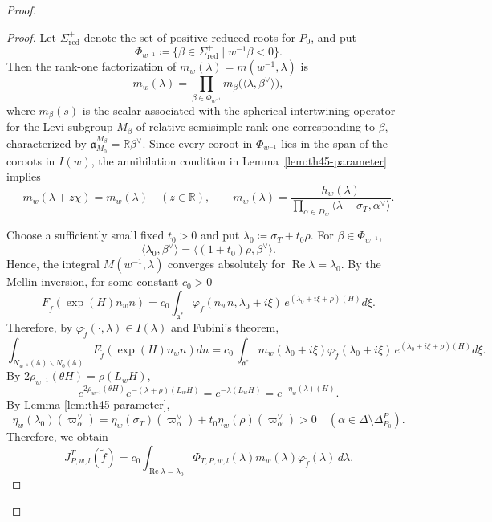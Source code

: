 \documentclass[12pt]{amsart}
\theoremstyle{definition}
\theoremstyle{plain}
\theoremstyle{remark}
\def\R{\mathbb{R}}%
\def\A{\mathbb{A}}%
\def\bs{\backslash}%
\newcommand{\fa}{\mathfrak{a}}
\numberwithin{equation}{section}
\newcommand{\tf}{\tilde{f}}
\begin{document}
\begin{proof}
\begin{proof}
Let $\Sigma_{\mathrm{red}}^+$ denote the set of positive reduced roots for $P_0$, and put
\[
 \Phi_{w^{-1}} \coloneqq  \{\beta\in\Sigma_{\mathrm{red}}^+\mid w^{-1}\beta<0\}.
\]
Then the rank-one factorization of \(m_w(\lambda)=m(w^{-1},\lambda)\) is
\[
 m_w(\lambda) =
 \prod_{\beta\in\Phi_{w^{-1}}}
 m_\beta\bigl(\langle\lambda,\beta^\vee\rangle\bigr),
\]
where $m_\beta(s)$ is the scalar associated with the spherical intertwining operator for the Levi subgroup $M_\beta$ of relative semisimple rank one corresponding to $\beta$, characterized by $\mathfrak a_{M_0}^{M_\beta}=\mathbb R\beta^\vee$. 
Since every coroot in $\Phi_{w^{-1}}$ lies in the span of the coroots in $I(w)$, 
the annihilation condition in Lemma~\ref{lem:th45-parameter} implies
\[
 m_w(\lambda+z\chi)=m_w(\lambda) \quad (z\in\R),\qquad
 m_w(\lambda)=
 \frac{h_w(\lambda)}
      {\prod_{\alpha\in D_w}
                       \langle\lambda-\sigma_T,\alpha^\vee\rangle}.
\]


Choose a sufficiently small fixed $t_0>0$ and put
$\lambda_0\coloneqq \sigma_T+t_0\rho$.
For $\beta\in\Phi_{w^{-1}}$, 
\[
\langle \lambda_0,\beta^\vee\rangle=\langle (1+t_0)\rho,\beta^\vee\rangle.
\]
Hence, the integral $M(w^{-1},\lambda)$ converges absolutely for $\operatorname{Re}\lambda=\lambda_0$. 
By the Mellin inversion, for some constant $c_0> 0$
\[
F_{\tf}(\exp(H)n_wn)=c_0 \int_{\fa^*} \varphi_{\tf}(n_wn,\lambda_0+i\xi)\, e^{(\lambda_0+i\xi+\rho)(H)}d\xi.
\]
Therefore, by $\varphi_{\tf}(\cdot,\lambda)\in I(\lambda)$ and Fubini's theorem, 
\[
\int_{N_{w^{-1}}(\A)\bs N_0(\A)} F_{\tf}(\exp(H)n_wn)dn=c_0 \, \int_{\fa^*}m_w(\lambda_0+i\xi) \varphi_{\tf}(\lambda_0+i\xi)\, e^{(\lambda_0+i\xi+\rho)(H)}d\xi.
\]
By $2\rho_{w^{-1}}(\theta H)=\rho(L_wH)$, 
\[
e^{2\rho_{w^{-1}}(\theta H)}e^{-(\lambda+\rho)(L_wH)}=e^{-\lambda(L_wH)}=e^{-\eta_w(\lambda)(H)}.
\]
By Lemma \ref{lem:th45-parameter},
\[
 \eta_w(\lambda_0)(\varpi_\alpha^\vee)
 =\eta_w(\sigma_T)(\varpi_\alpha^\vee)
       +t_0\eta_w(\rho)(\varpi_\alpha^\vee)>0
 \quad(\alpha\in\Delta\setminus\Delta_{P_0}^P).
\]
Therefore, we obtain
\begin{equation}\label{eq:th45-mellin}
 J_{P,w,l}^T(\tf)
 =c_0\int_{\operatorname{Re}\lambda=\lambda_0}
       \Phi_{T,P,w,l}(\lambda)m_w(\lambda)
       \varphi_{\tf}(\lambda)\,d\lambda.
\end{equation}



\end{proof}
\end{proof}
\end{document}
